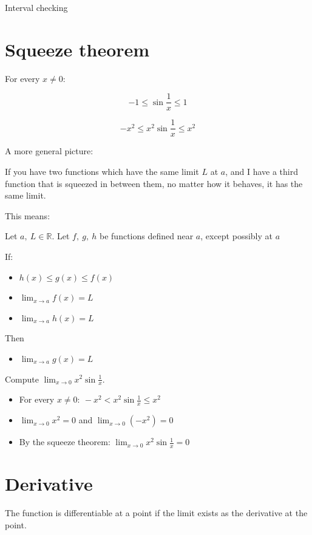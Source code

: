 \documentclass[
]{article}
\begin{document}
Interval checking


\section{Squeeze theorem}

For every $x \neq 0$:

$$- 1 \leq \sin\frac{1}{x} \leq 1$$

$$- x^{2} \leq x^{2}\sin\frac{1}{x} \leq x^{2}$$

A more general picture:

If you have two functions which have the same limit $L$ at $a$, and
I have a third function that is squeezed in between them, no matter how
it behaves, it has the same limit.

This means:

Let $a,\ L\mathbb{\in R}$. Let $f,\ g,\ h$ be functions defined near
$a$, except possibly at $a$

If:

\begin{itemize}
\item
  $h(x) \leq g(x) \leq f(x)$
\item
  $\lim_{x \rightarrow a}{f(x)} = L$
\item
  $\lim_{x \rightarrow a}{h(x)} = L$
\end{itemize}

Then

\begin{itemize}
\item
  $\lim_{x \rightarrow a}{g(x)} = L$
\end{itemize}

Compute $\lim_{x \rightarrow 0}{x^{2}\sin\frac{1}{x}}$.

\begin{itemize}
\item
  For every $x \neq 0:\  - x^{2} < x^{2}\sin\frac{1}{x} \leq x^{2}$
\item
  $\lim_{x \rightarrow 0}x^{2} = 0$ and
  $\lim_{x \rightarrow 0}{( - x^{2})} = 0$
\item
  By the squeeze theorem:
  $\lim_{x \rightarrow 0}{x^{2}\sin\frac{1}{x} = 0}$
\end{itemize}


\section{Derivative}

The function is differentiable at a point if the limit exists as the
derivative at the point.
\end{document}
